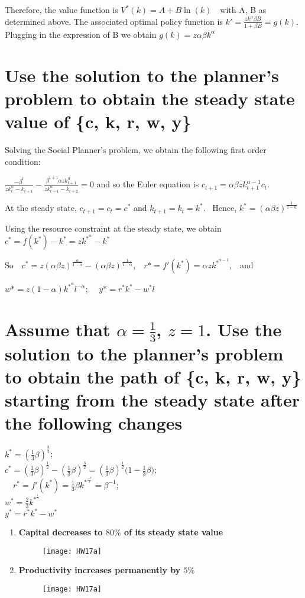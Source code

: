 \documentclass[12pt,a4paper]{article}
\begin{document}
Therefore, the value function is $V^*(k)=A+B \ln(k)$~~with A, B
as determined above. The associated optimal policy function is $k'=\frac{zk^\alpha\beta B}{1+\beta B}=g(k)$. Plugging in the expression of B we obtain $g(k)=z\alpha \beta k^\alpha $

\section{Use the solution to the planner’s problem to obtain the steady state value of \{c, k, r, w, y\}}

Solving the Social Planner's problem, we obtain the following first order condition:

$\frac{-\beta^{t}}{zk^{\alpha}_{t}-k_{t+1}}-\frac{\beta^{t+1} \alpha zk^{\alpha}_{t+1}}{zk^{\alpha}_{t+1}-k_{t+2}}=0$  and so the Euler equation is $c_{t+1}=\alpha \beta z k_{t+1}^{\alpha-1} c_{t}$.

At the steady state, $c_{t+1}=c_{t}=c^*$ and $k_{t+1}=k_{t}=k^*$. ~Hence, $k^*=(\alpha \beta z)^{\frac{1}{1-\alpha}}$

Using the resource constraint at the steady state, we obtain $c^*=f(k^*)-k^*=zk^{*^{\alpha}}-k^*$ 

So~~$c^*=z(\alpha \beta z)^{\frac{\alpha}{1-\alpha}}-(\alpha \beta z)^{\frac{1}{1-\alpha}}$,~~$r*=f'(k^*)=\alpha zk^{*^{\alpha-1}}$,~~and

$w*=z(1-\alpha)k^{*^{\alpha}}l^{-\alpha}$; ~~$y*=r^*k^*-w^{*}l$

\section{ Assume that  $\alpha=\frac{1}{3}$, $z = 1$. Use the solution to the planner’s problem to obtain the path of \{c, k, r, w, y\} starting from the steady state after the following changes}

$k^*=(\frac{1}{3}\beta )^{\frac{3}{2}}$;~~\\
$c^*=(\frac{1}{3}\beta )^{\frac{1}{2}}-(\frac{1}{3}\beta )^{\frac{3}{2}}=(\frac{1}{3}\beta )^{\frac{1}{2}}\big(1-\frac{1}{3}\beta\big)$;\\ ~~$r^*=f'(k^*)=\frac{1}{3}\beta k^{*^{\frac{-2}{3}}}=\beta^{-1}$;  \\
$w^*=\frac{2}{3}k^{*^{\frac{1}{3}}}$\\
$y^*=r^*k^*-w^{*}$

\begin{enumerate}
\item \textbf{Capital decreases to $80\%$ of its steady state value}

\begin{figure}[htbp]
\centerline{\texttt{[image: HW17a]}}
\label{fig}
\end{figure}

\item \textbf{Productivity increases permanently by $5\%$}

\begin{figure}[htbp]
\centerline{\texttt{[image: HW17a]}}
\label{fig}
\end{figure}

\end{enumerate}
\end{document}
